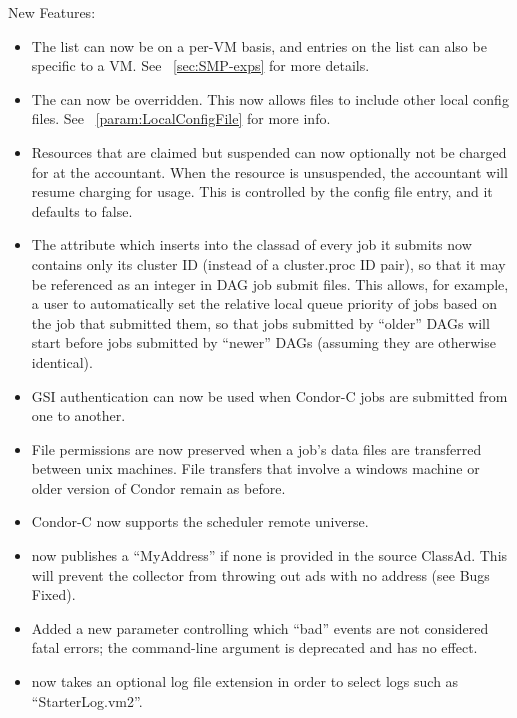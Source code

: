 \noindent New Features:

\begin{itemize}

\item The  list can now be on a per-VM basis, and
entries on the list can also be specific to a VM. 
See ~\ref{sec:SMP-exps} for more details.

\item The  can now be overridden. 
This now allows files to include other local config files. 
See ~\ref{param:LocalConfigFile} for more info.

\item Resources that are claimed but suspended can now optionally 
not be charged for at the accountant. 
When the resource is unsuspended, the accountant will resume charging
for usage. 
This is controlled by the 
config file entry, and it defaults to false.

\item The  attribute which  inserts
into the classad of every job it submits now contains only its cluster
ID (instead of a cluster.proc ID pair), so that it may be referenced
as an integer in DAG job submit files.  This allows, for example, a
user to automatically set the relative local queue priority of jobs
based on the  job that submitted them, so that jobs
submitted by ``older'' DAGs will start before jobs submitted by
``newer'' DAGs (assuming they are otherwise identical).

\item GSI authentication can now be used when Condor-C jobs are submitted
from one  to another.

\item File permissions are now preserved when a job's data files are
transferred between unix machines. File transfers that involve a windows
machine or older version of Condor remain as before.

\item Condor-C now supports the scheduler remote universe.

\item {} now publishes a ``MyAddress'' if none is provided
in the source ClassAd.  This will prevent the collector from throwing out
ads with no address (see Bugs Fixed).

\item Added a new  parameter 
controlling which ``bad'' events are not considered fatal errors;
the  command-line argument is deprecated and has no effect.

\item {} now takes an optional log file extension in order to
select logs such as ``StarterLog.vm2''.

\end{itemize}



